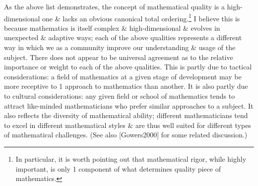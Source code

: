 \documentclass[oneside]{book}
\numberwithin{equation}{section}
\begin{document}
As the above list demonstrates, the concept of mathematical quality is a high-dimensional one \& lacks an obvious canonical total ordering.\footnote{In particular, it is worth pointing out that mathematical rigor, while highly important, is only 1 component of what determines quality piece of mathematics.} I believe this is because mathematics is itself complex \& high-dimensional \& evolves in unexpected \& adaptive ways; each of the above qualities represents a different way in which we as a community improve our understanding \& usage of the subject. There does not appear to be universal agreement as to the relative importance or weight to each of the above qualities. This is partly due to tactical considerations: a field of mathematics at a given stage of development may be more receptive to 1 approach to mathematics than another. It is also partly due to cultural considerations: any given field or school of mathematics tends to attract like-minded mathematicians who prefer similar approaches to a subject. It also reflects the diversity of mathematical ability; different mathematicians tend to excel in different mathematical styles \& are thus well suited for different types of mathematical challenges. (See also [Gowers2000] for some related discussion.)
\end{document}
